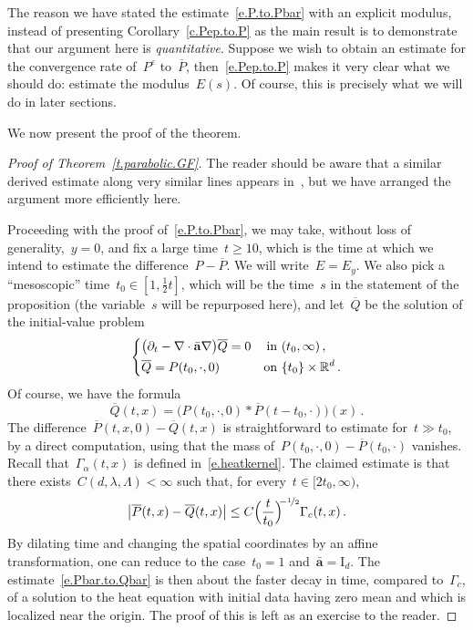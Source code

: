 \documentclass[11pt,twoside]{article} %
\numberwithin{equation}{section}
\theoremstyle{definition}
\let\originalleft\left
\let\originalright\right
\renewcommand{\left}{\mathopen{}\mathclose\bgroup\originalleft}
\renewcommand{\right}{\aftergroup\egroup\originalright}
\newcommand*{\Id}{\ensuremath{\mathrm{I}_d}}
\newcommand*{\Rd}{\ensuremath{\mathbb{R}^d}}
\newcommand{\eps}{\varepsilon}
\newcommand{\ep}{\eps}
\renewcommand{\a}{\mathbf{a}}
\newcommand{\ahom}{\bar{\a}}
\begin{document}
\smallskip

The reason we have stated the estimate~\eqref{e.P.to.Pbar} with an explicit modulus, instead of presenting Corollary~\ref{c.Pep.to.P} as the main result is to demonstrate that our argument here is \emph{quantitative}. Suppose we wish to obtain an estimate for the convergence rate of~$P^\ep$ to~$\overline{P}$, then~\eqref{e.Pep.to.P} makes it very clear what we should do: estimate the modulus~$E(s)$. Of course, this is precisely what we will do in later sections. 

\smallskip

We now present the proof of the theorem. 

\begin{proof}[{Proof of Theorem~\ref{t.parabolic.GF}}]
The reader should be aware that a similar derived estimate along very similar lines appears in~\cite[Theorem 8.20]{AKMBook}, 
but we have arranged the argument more efficiently here. 

\smallskip

Proceeding with the proof of~\eqref{e.P.to.Pbar}, we may take, without loss of generality,~$y=0$, and fix a large time~$t \geq 10$, which is the time at which we intend to estimate the difference~$P-\overline{P}$. We will write~$E=E_y$. We also pick a ``mesoscopic'' time~$t_0 \in [1,\frac12 t]$, which will be the time~$s$ in the statement of the proposition (the variable~$s$ will be repurposed here), and let~$\overline{Q}$ be the solution of the initial-value problem 
\begin{equation*}
\left\{
\begin{aligned}
& \bigl( \partial_t - \nabla \cdot\ahom\nabla \bigr) \overline{Q}
= 0 & \mbox{in} & \ (t_0,\infty)\,, \\
&  \overline{Q} = P(t_0,\cdot,0) & \mbox{on} & \ \{ t_0 \} \times \Rd\,.
\end{aligned}
\right.
\end{equation*}
Of course, we have the formula
\begin{equation}
\label{e.Qbar.convformula}
\overline{Q}(t,x) = \bigl( P(t_0,\cdot,0) \ast \overline{P}(t-t_0,\cdot) \bigr)(x)
\,.
\end{equation}
The difference~$\overline{P}(t,x,0) - \overline{Q}(t,x)$ is straightforward to estimate for~$t\gg t_0$, by a direct computation, using that the mass of~$P(t_0,\cdot,0) - \overline{P}(t_0,\cdot)$ vanishes. 
Recall that~$\Gamma_\alpha(t,x)$ is defined in~\eqref{e.heatkernel}. 
The claimed estimate is that there exists~$C(d,\lambda,\Lambda)<\infty$ such that, for every~$t \in [2t_0,\infty)$, 
\begin{equation}
\label{e.Pbar.to.Qbar}
\bigl| \overline{P}(t,x) - \overline{Q} (t,x)\bigr|
\leq 
C \Bigl( \frac t{t_0} \Bigr)^{\!\!-\nicefrac12}
\Gamma_c (t,x)
\,.
\end{equation}
By dilating time and changing the spatial coordinates by an affine transformation, one can reduce to the case~$t_0=1$ and~$\ahom =  \Id$. The estimate~\eqref{e.Pbar.to.Qbar} is then about the faster decay in time, compared to~$\Gamma_c$, of a solution to the heat equation with initial data having zero mean and which is localized near the origin. The proof of this is left as an exercise 
to the reader. 


\end{proof}
\end{document}
